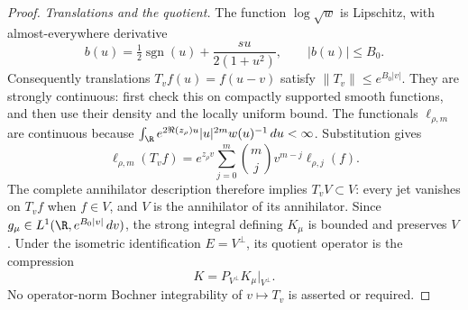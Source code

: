 \begin{proof}
\emph{Translations and the quotient.}
The function $\log\sqrt w$ is Lipschitz, with almost-everywhere derivative
\[
 b(u)=\tfrac12\operatorname{sgn}(u)+\frac{s u}{2(1+u^2)},
 \qquad |b(u)|\le B_0.
\]
Consequently translations $T_vf(u)=f(u-v)$ satisfy
$\|T_v\|\le e^{B_0|v|}$. They are strongly continuous: first check this on compactly supported smooth functions, and then use their density and the locally uniform bound. The functionals $\ell_{\rho,m}$ are continuous because
$\int_{\R}e^{2\Re(z_\rho)u}|u|^{2m}w(u)^{-1}\,du<\infty$. Substitution gives
\begin{equation}\label{eq:masjettranslation}
 \ell_{\rho,m}(T_vf)=e^{z_\rho v}
 \sum_{j=0}^m\binom{m}{j}v^{m-j}\ell_{\rho,j}(f).
\end{equation}
The complete annihilator description therefore implies $T_vV\subset V$: every jet vanishes on $T_vf$ when $f\in V$, and $V$ is the annihilator of its annihilator. Since
$g_\mu\in L^1(\R,e^{B_0|v|}\,dv)$, the strong integral defining $K_\mu$ is bounded and preserves $V$. Under the isometric identification $E=V^\perp$, its quotient operator is the compression
\[
 K=P_{V^\perp}K_\mu|_{V^\perp}.
\]
No operator-norm Bochner integrability of $v\mapsto T_v$ is asserted or required.


\end{proof}
